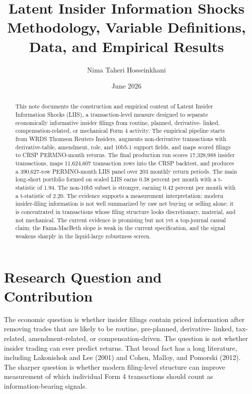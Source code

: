 \documentclass[11pt]{article}
\title{\textbf{Latent Insider Information Shocks}\\
\large Methodology, Variable Definitions, Data, and Empirical Results}
\author{Nima Taheri Hosseinkhani}
\date{June 2026}
\begin{document}
\maketitle

\begin{abstract}
This note documents the construction and empirical content of Latent Insider
Information Shocks (LIIS), a transaction-level measure designed to separate
economically informative insider filings from routine, planned, derivative-
linked, compensation-related, or mechanical Form 4 activity. The empirical
pipeline starts from WRDS Thomson Reuters Insiders, augments non-derivative
transactions with derivative-table, amendment, role, and 10b5-1 support fields,
and maps scored filings to CRSP PERMNO-month returns. The final production run
scores 17,328,988 insider transactions, maps 11,624,607 transaction rows into
the CRSP backtest, and produces a 390,627-row PERMNO-month LIIS panel over 203
monthly return periods. The main long-short portfolio formed on scaled LIIS earns
0.38 percent per month with a t-statistic of 1.94. The non-10b5 subset is
stronger, earning 0.42 percent per month with a t-statistic of 2.20. The evidence
supports a measurement interpretation: modern insider-filing information is not
well summarized by raw net buying or selling alone; it is concentrated in
transactions whose filing structure looks discretionary, material, and not
mechanical. The current evidence is promising but not yet a top-journal causal
claim; the Fama-MacBeth slope is weak in the current specification, and the
signal weakens sharply in the liquid-large robustness screen.
\end{abstract}

\section{Research Question and Contribution}

The economic question is whether insider filings contain priced information
after removing trades that are likely to be routine, pre-planned, derivative-
linked, tax-related, amendment-related, or compensation-driven. The question is
not whether insider trading can ever predict returns. That broad fact has a long
literature, including Lakonishok and Lee (2001) and Cohen, Malloy, and Pomorski
(2012). The sharper question is whether modern filing-level structure can
improve measurement of which individual Form 4 transactions should count as
information-bearing signals.
\end{document}
